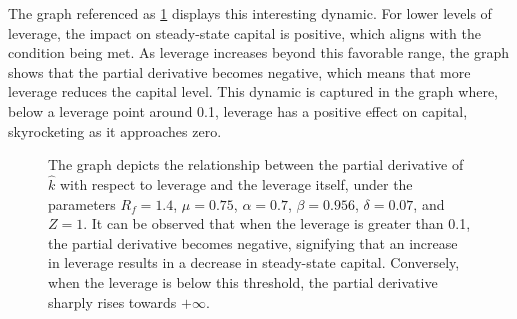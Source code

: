 \documentclass[12pt]{report}
\begin{document}
The graph referenced as \ref{plot_part} displays this interesting dynamic. For lower levels of leverage, the impact on
steady-state capital is positive, which aligns with the condition being met. As leverage increases beyond this favorable
range, the graph shows that the partial derivative becomes negative, which means that more leverage reduces the capital
level. This dynamic is captured in the graph where, below a leverage point around 0.1, leverage has a positive effect on
capital, skyrocketing as it approaches zero. 
\begin{figure}
    \centering
    \caption{The graph depicts the relationship between the partial derivative of \(\hat{k}\) with respect to
        leverage and the leverage itself, under the parameters \(R_f=1.4\), \(\mu=0.75\), \(\alpha= 0.7\),
        \(\beta=0.956\), \(\delta =0.07\), and \(Z=1\). It can be observed that when the leverage is greater than 0.1,
        the partial derivative becomes negative, signifying that an increase in leverage results in a decrease in
        steady-state capital. Conversely, when the leverage is below this threshold, the partial derivative sharply
        rises towards \(+\infty\). }

    \label{plot_part}
\end{figure}
\end{document}
